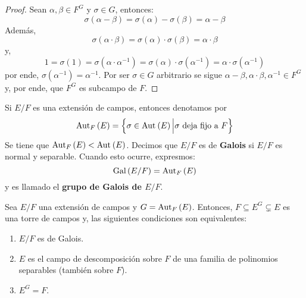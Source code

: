 \documentclass[12pt]{report}
\theoremstyle{largebreak}
\begin{document}
    \begin{proof}
        Sean $\alpha,\beta\in F^G$ y $\sigma\in G$, entonces:
        \begin{equation*}
            \sigma(\alpha-\beta)=\sigma(\alpha)-\sigma(\beta)=\alpha-\beta
        \end{equation*}
        Además, 
        \begin{equation*}
            \sigma(\alpha\cdot\beta)=\sigma(\alpha)\cdot\sigma(\beta)=\alpha\cdot\beta
        \end{equation*}
        y,
        \begin{equation*}
            1=\sigma(1)=\sigma(\alpha\cdot\alpha^{-1})=\sigma(\alpha)\cdot\sigma(\alpha^{-1})=\alpha\cdot\sigma(\alpha^{-1})
        \end{equation*}
        por ende, $\sigma(\alpha^{-1})=\alpha^{-1}$. Por ser $\sigma\in G$ arbitrario se sigue $\alpha-\beta,\alpha\cdot\beta,\alpha^{-1}\in F^G$ y, por ende, que $F^G$ es subcampo de $F$.
    \end{proof}

    \begin{mydef}
        Si $E/F$ es una extensión de campos, entonces denotamos por
        \begin{equation*}
            \textup{Aut}_{F}\left(E\right)=\left\{\sigma\in\textup{Aut}_{}\left(E\right)\Big|\sigma\textup{ deja fijo a }F \right\}
        \end{equation*}
        Se tiene que $\textup{Aut}_{F}\left(E\right)<\textup{Aut}_{}\left(E\right)$. Decimos que $E/F$ es de \textbf{Galois} si $E/F$ es normal y separable. Cuando esto ocurre, expresmos:
        \begin{equation*}
            \textup{Gal}\left(E/F\right)=\textup{Aut}_{F}\left(E\right)
        \end{equation*}
        y es llamado el \textbf{grupo de Galois de $E/F$}.
    \end{mydef}

    \begin{propo}
        Sea $E/F$ una extensión de campos y $G=\textup{Aut}_{F}\left(E\right)$. Entonces, $F\subseteq E^G\subsetneq E$ es una torre de campos y, las siguientes condiciones son equivalentes:
        \begin{enumerate}
            \item $E/F$ es de Galois.
            \item $E$ es el campo de descomposición sobre $F$ de una familia de polinomios separables (también sobre $F$).
            \item $E^G=F$.
        \end{enumerate}
    \end{propo}
\end{document}
